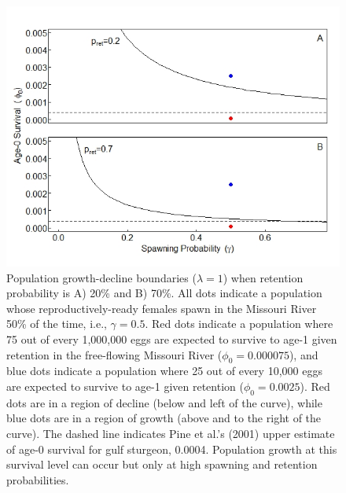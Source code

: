 \documentclass[12pt]{article}
\begin{document}
\begin{figure}[h]
\centering
\includegraphics[width=6in]{NEPA_Fig_8-boundary-example}
\caption{Population growth-decline boundaries ($\lambda=1$) when retention probability is A) 20\% and B) 70\%.  All dots indicate a population whose reproductively-ready females spawn in the Missouri River 50\% of the time, i.e., $\gamma=0.5$.  Red dots indicate a population where 75 out of every 1,000,000 eggs are expected to survive to age-1 given retention in the free-flowing Missouri River ($\phi_0=0.000075$), and blue dots indicate a population where 25 out of every 10,000 eggs are expected to survive to age-1 given retention ($\phi_0=0.0025$).  Red dots are in a region of decline (below and left of the curve), while blue dots are in a region of growth (above and to the right of the curve).  The dashed line indicates Pine et al.'s (2001) upper estimate of age-0 survival for gulf sturgeon, 0.0004.  Population growth at this survival level can occur but only at high spawning and retention probabilities.}
\label{boundaryEx}
\end{figure}
\end{document}
